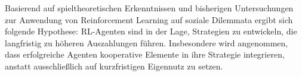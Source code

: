 Basierend auf spieltheoretischen Erkenntnissen und bisherigen Untersuchungen zur 
Anwendung von Reinforcement Learning auf soziale Dilemmata ergibt sich folgende Hypothese: 
RL-Agenten sind in der Lage, Strategien zu entwickeln, die langfristig zu höheren 
Auszahlungen führen. Insbesondere wird angenommen, dass erfolgreiche Agenten 
kooperative Elemente in ihre Strategie integrieren, anstatt ausschließlich auf 
kurzfristigen Eigennutz zu setzen.